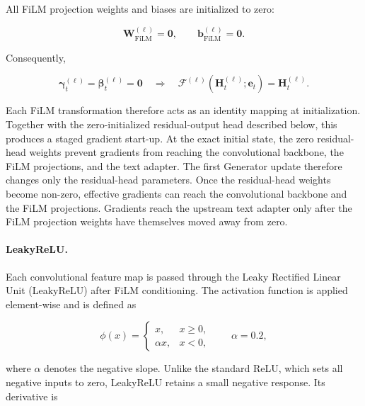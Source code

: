 All FiLM projection weights and biases are initialized to zero:

\begin{equation}\label{eq:ch3:film_identity_initialization}
\mathbf{W}_{\mathrm{FiLM}}^{(\ell)}
=
\mathbf{0},
\qquad
\mathbf{b}_{\mathrm{FiLM}}^{(\ell)}
=
\mathbf{0}.
\end{equation}

Consequently,

\begin{equation}\label{eq:ch3:film_initial_parameters}
\boldsymbol{\gamma}^{(\ell)}_t
=
\boldsymbol{\beta}^{(\ell)}_t
=
\mathbf{0}
\quad\Longrightarrow\quad
\mathcal{F}^{(\ell)}
\left(
\mathbf{H}^{(\ell)}_t;
\mathbf{e}_t
\right)
=
\mathbf{H}^{(\ell)}_t.
\end{equation}

Each FiLM transformation therefore acts as an identity mapping at
initialization. Together with the zero-initialized residual-output head
described below, this produces a staged gradient start-up. At the exact
initial state, the zero residual-head weights prevent gradients from reaching
the convolutional backbone, the FiLM projections, and the text adapter. The
first Generator update therefore changes only the residual-head parameters.
Once the residual-head weights become non-zero, effective gradients can reach
the convolutional backbone and the FiLM projections. Gradients reach the
upstream text adapter only after the FiLM projection weights have themselves
moved away from zero.



\paragraph*{LeakyReLU.}
Each convolutional feature map is passed through the Leaky Rectified Linear
Unit (LeakyReLU) after FiLM conditioning. The activation function is applied
element-wise and is defined as

\begin{equation}\label{eq:ch3:leaky_relu}
\phi(x)
=
\begin{cases}
x, & x\geq 0,\\
\alpha x, & x<0,
\end{cases}
\qquad
\alpha=0.2,
\end{equation}

where $\alpha$ denotes the negative slope. Unlike the standard ReLU, which
sets all negative inputs to zero, LeakyReLU retains a small negative response.
Its derivative is

